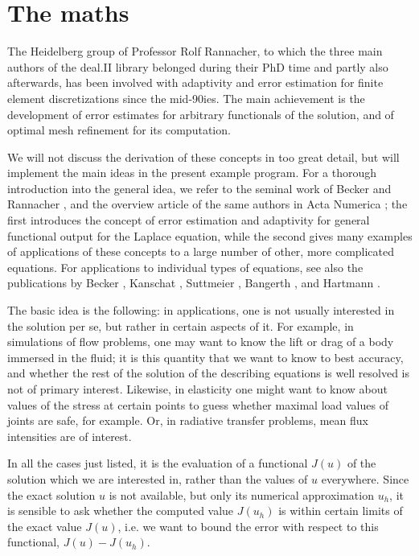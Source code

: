 \documentclass{article}
\begin{document}
\section{The maths}

The Heidelberg group of Professor Rolf Rannacher, to which the three main
authors of the deal.II library belonged during their PhD time and partly also
afterwards, has been involved with adaptivity and error estimation for finite
element discretizations since the mid-90ies. The main achievement is the
development of error estimates for arbitrary functionals of the solution, and
of optimal mesh refinement for its computation.

We will not discuss the derivation of these concepts in too great detail, but
will implement the main ideas in the present example program. For a thorough
introduction into the general idea, we refer to the seminal work of Becker and
Rannacher \cite{BR95,BR96r}, and the overview article of the same authors in
Acta Numerica \cite{BR01}; the first introduces the concept of error
estimation and adaptivity for general functional output for the Laplace
equation, while the second gives many examples of applications of these
concepts to a large number of other, more complicated equations. For
applications to individual types of equations, see also the publications by
Becker \cite{Bec95,Bec98}, Kanschat \cite{Kan96,FK97}, Suttmeier
\cite{Sut96,RS97,RS98c,RS99}, Bangerth \cite{BR99b,Ban00w,BR01a,Ban02}, and
Hartmann \cite{Har02,HH01,HH01b}.

The basic idea is the following: in applications, one is not usually
interested in the solution per se, but rather in certain aspects of it. For
example, in simulations of flow problems, one may want to know the lift or
drag of a body immersed in the fluid; it is this quantity that we want to know
to best accuracy, and whether the rest of the solution of the describing
equations is well resolved is not of primary interest. Likewise, in elasticity
one might want to know about values of the stress at certain points to guess
whether maximal load values of joints are safe, for example. Or, in radiative
transfer problems, mean flux intensities are of interest.

In all the cases just listed, it is the evaluation of a functional $J(u)$ of
the solution which we are interested in, rather than the values of $u$
everywhere. Since the exact solution $u$ is not available, but only its
numerical approximation $u_h$, it is sensible to ask whether the computed
value $J(u_h)$ is within certain limits of the exact value $J(u)$, i.e. we
want to bound the error with respect to this functional, $J(u)-J(u_h)$.
\end{document}
